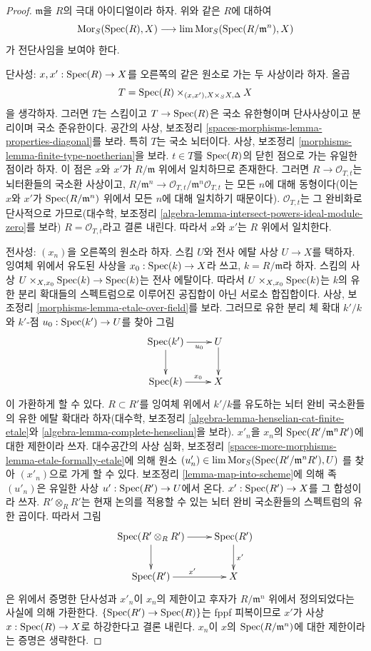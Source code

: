 \begin{proof}
$\mathfrak m$을 $R$의 극대 아이디얼이라 하자. 위와 같은 $R$에 대하여
$$
\mathop{\mathrm{Mor}}\nolimits_S(\mathop{\mathrm{Spec}}(R), X) \longrightarrow \mathop{\mathrm{lim}}\nolimits \mathop{\mathrm{Mor}}\nolimits_S(\mathop{\mathrm{Spec}}(R/\mathfrak m^n), X)
$$
가 전단사임을 보여야 한다.

\medskip\noindent
단사성: $x, x' : \mathop{\mathrm{Spec}}(R) \to X$를 오른쪽의 같은 원소로 가는 두
사상이라 하자. 올곱
$$
T = \mathop{\mathrm{Spec}}(R) \times_{(x, x'), X \times_S X, \Delta} X
$$
을 생각하자. 그러면 $T$는 스킴이고 $T \to \mathop{\mathrm{Spec}}(R)$은 국소
유한형이며 단사사상이고 분리이며 국소 준유한이다. 공간의 사상, 보조정리
\ref{spaces-morphisms-lemma-properties-diagonal}를 보라. 특히 $T$는
국소 뇌터이다. 사상, 보조정리
\ref{morphisms-lemma-finite-type-noetherian}을 보라.
$t \in T$를 $\mathop{\mathrm{Spec}}(R)$의 닫힌 점으로 가는 유일한 점이라 하자.
이 점은 $x$와 $x'$가 $R/\mathfrak m$ 위에서 일치하므로 존재한다.
그러면 $R \to \mathcal{O}_{T, t}$는 뇌터환들의 국소환 사상이고,
$R/\mathfrak m^n \to \mathcal{O}_{T, t}/\mathfrak m^n\mathcal{O}_{T, t}$
는 모든 $n$에 대해 동형이다(이는 $x$와 $x'$가
$\mathop{\mathrm{Spec}}(R/\mathfrak m^n)$ 위에서 모든 $n$에 대해 일치하기 때문이다).
$\mathcal{O}_{T, t}$는 그 완비화로 단사적으로 가므로(대수학, 보조정리
\ref{algebra-lemma-intersect-powers-ideal-module-zero}를 보라)
$R = \mathcal{O}_{T, t}$라고 결론 내린다. 따라서 $x$와 $x'$는
$R$ 위에서 일치한다.

\medskip\noindent
전사성: $(x_n)$을 오른쪽의 원소라 하자. 스킴 $U$와 전사 에탈 사상
$U \to X$를 택하자. 잉여체 위에서 유도된 사상을
$x_0 : \mathop{\mathrm{Spec}}(k) \to X$라 쓰고, $k = R/\mathfrak m$라 하자.
스킴의 사상
$U \times_{X, x_0} \mathop{\mathrm{Spec}}(k) \to \mathop{\mathrm{Spec}}(k)$는 전사 에탈이다. 따라서
$U \times_{X, x_0} \mathop{\mathrm{Spec}}(k)$는 $k$의 유한 분리 확대들의 스펙트럼으로
이루어진 공집합이 아닌 서로소 합집합이다. 사상, 보조정리
\ref{morphisms-lemma-etale-over-field}를 보라. 그러므로 유한 분리
체 확대 $k'/k$와 $k'$-점 $u_0 : \mathop{\mathrm{Spec}}(k') \to U$를 찾아 그림
$$
\xymatrix{
\Spec(k') \ar[d] \ar[r]_-{u_0} & U \ar[d] \\
\Spec(k) \ar[r]^-{x_0} & X
}
$$
이 가환하게 할 수 있다. $R \subset R'$를 잉여체 위에서 $k'/k$를
유도하는 뇌터 완비 국소환들의 유한 에탈 확대라 하자(대수학, 보조정리
\ref{algebra-lemma-henselian-cat-finite-etale}와
\ref{algebra-lemma-complete-henselian}을 보라). $x'_n$을 $x_n$의
$\mathop{\mathrm{Spec}}(R'/\mathfrak m^nR')$에 대한 제한이라 쓰자.
대수공간의 사상 심화, 보조정리
\ref{spaces-more-morphisms-lemma-etale-formally-etale}에 의해 원소
$(u'_n) \in \mathop{\mathrm{lim}}\nolimits \mathop{\mathrm{Mor}}\nolimits_S(\mathop{\mathrm{Spec}}(R'/\mathfrak m^nR'), U)$
를 찾아 $(x'_n)$으로 가게 할 수 있다. 보조정리
\ref{lemma-map-into-scheme}에 의해 족 $(u'_n)$은 유일한 사상
$u' : \mathop{\mathrm{Spec}}(R') \to U$에서 온다. $x' : \mathop{\mathrm{Spec}}(R') \to X$를 그 합성이라
쓰자. $R' \otimes_R R'$는 현재 논의를 적용할 수 있는 뇌터 완비
국소환들의 스펙트럼의 유한 곱이다. %
따라서 그림
$$
\xymatrix{
\Spec(R' \otimes_R R') \ar[r] \ar[d] & \Spec(R') \ar[d]^{x'} \\
\Spec(R') \ar[r]^{x'} & X
}
$$
은 위에서 증명한 단사성과 $x'_n$이 $x_n$의 제한이고 후자가
$R/\mathfrak m^n$ 위에서 정의되었다는 사실에 의해 가환한다.
$\{\mathop{\mathrm{Spec}}(R') \to \mathop{\mathrm{Spec}}(R)\}$는 fppf 피복이므로 $x'$가 사상
$x : \mathop{\mathrm{Spec}}(R) \to X$로 하강한다고 결론 내린다. $x_n$이 $x$의
$\mathop{\mathrm{Spec}}(R/\mathfrak m^n)$에 대한 제한이라는 증명은 생략한다.
\end{proof}

